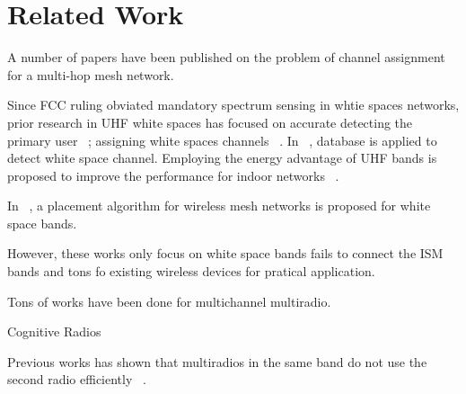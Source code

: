 \section{Related Work}
\label{sec:related}

A number of papers have been published on the problem of channel assignment for a multi-hop mesh network.




Since FCC ruling obviated mandatory spectrum sensing in whtie spaces networks, prior research in UHF white spaces has focused on accurate detecting the primary user ~\cite{kim2008fast}; assigning white spaces channels ~\cite{bahl2009white}.
In ~\cite{murty2012senseless}, database is applied to detect white space channel.
Employing the energy advantage of UHF bands is proposed to improve the performance for indoor networks ~\cite{radunovic2010rethinking}.   


In ~\cite{robinson2010deploying}, a placement algorithm for wireless mesh networks is proposed for white space bands.

However, these works only focus on white space bands fails to connect the ISM bands and tons fo existing wireless devices for pratical application.

 Tons of works have been done for multichannel multiradio.

 Cognitive Radios




Previous works has shown that multiradios in the same band do not use the second radio efficiently ~\cite{robinson2007performance}.
 
